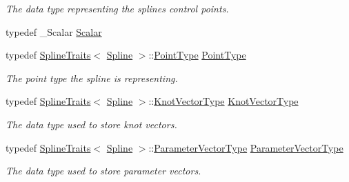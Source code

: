 \begin{DoxyCompactItemize}
\begin{DoxyCompactList}\small\item\em The data type representing the spline\textquotesingle{}s control points. \end{DoxyCompactList}\item 
typedef \+\_\+\+Scalar \hyperlink{group___splines___module_a8cafd78b564825c76fbb3419653d9742}{Scalar}
\item 
\mbox{\label{group___splines___module_a9ade8a2f81dae6eedb8845cb080672bd}} 
typedef \hyperlink{struct_eigen_1_1_spline_traits}{Spline\+Traits}$<$ \hyperlink{group___splines___module_class_eigen_1_1_spline}{Spline} $>$\+::\hyperlink{group___splines___module_a9ade8a2f81dae6eedb8845cb080672bd}{Point\+Type} \hyperlink{group___splines___module_a9ade8a2f81dae6eedb8845cb080672bd}{Point\+Type}
\begin{DoxyCompactList}\small\item\em The point type the spline is representing. \end{DoxyCompactList}\item 
\mbox{\label{group___splines___module_a066f7a8b120316c9068b559f0790e9ec}} 
typedef \hyperlink{struct_eigen_1_1_spline_traits}{Spline\+Traits}$<$ \hyperlink{group___splines___module_class_eigen_1_1_spline}{Spline} $>$\+::\hyperlink{group___splines___module_a066f7a8b120316c9068b559f0790e9ec}{Knot\+Vector\+Type} \hyperlink{group___splines___module_a066f7a8b120316c9068b559f0790e9ec}{Knot\+Vector\+Type}
\begin{DoxyCompactList}\small\item\em The data type used to store knot vectors. \end{DoxyCompactList}\item 
\mbox{\label{group___splines___module_a04bcc878ef5c8316e8cc60b4cf00d77c}} 
typedef \hyperlink{struct_eigen_1_1_spline_traits}{Spline\+Traits}$<$ \hyperlink{group___splines___module_class_eigen_1_1_spline}{Spline} $>$\+::\hyperlink{group___splines___module_a04bcc878ef5c8316e8cc60b4cf00d77c}{Parameter\+Vector\+Type} \hyperlink{group___splines___module_a04bcc878ef5c8316e8cc60b4cf00d77c}{Parameter\+Vector\+Type}
\begin{DoxyCompactList}\small\item\em The data type used to store parameter vectors. \end{DoxyCompactList}\item 

\end{DoxyCompactItemize}
